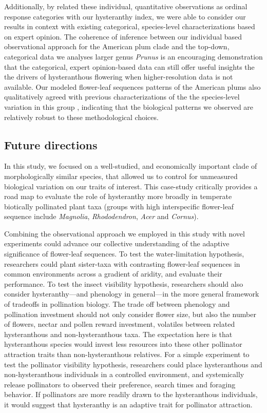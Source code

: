 \documentclass{article}[11pt]
\begin{document}
{Additionally, by related these individual, quantitative observations as ordinal response categories with our hysteranthy index, we were able to consider our results in context with existing categorical, species-level characterizations based on expert opinion. The coherence of inference between our individual based observational approach for the American plum clade and the top-down, categorical data we analyses larger genus \emph{Prunus} is an encouraging demonstration that the categorical, expert opinion-based data can still offer useful insights the the drivers of hysteranthous flowering when higher-resolution data is not available. Our modeled flower-leaf sequences patterns of the American plums also qualitatively agreed with previous characterizations of the the species-level variation in this group \citep{Shaw:2004aa}, indicating that the biological patterns we observed are relatively robust to these methodological choices.

\subsection*{Future directions}

In this study, we focused on a well-studied, and economically important clade of morphologically similar species, that allowed us to control for unmeasured biological variation on our traits of interest. This case-study critically provides a road map to evaluate the role of hysteranthy more broadly in temperate biotically pollinated plant taxa (groups with high interspecific flower-leaf sequence include \emph{Magnolia}, \emph{Rhododendron}, \emph{Acer} and \emph{Cornus}). 

Combining the observational approach we employed in this study with novel experiments could advance our collective understanding of the adaptive significance of flower-leaf sequences. To test the water-limitation hypothesis, researchers could plant sister-taxa with contrasting flower-leaf sequences in common environments across a gradient of aridity, and evaluate their performance. To test the insect visibility hypothesis, researchers should also consider hysteranthy---and phenology in general---in the more general framework of tradeoffs in pollination biology. The trade off between phenology and pollination investment should not only consider flower size, but also the number of flowers, nectar and pollen reward investment, volatiles between related hysteranthous and non-hysteranthous taxa. The expectation here is that hysteranthous species would invest less resources into these other pollinator attraction traits than non-hysteranthous relatives. For a simple experiment to test the pollinator visibility hypothesis, researchers could place hysteranthous and non-hysteranthous individuals in a controlled environment, and systemically release pollinators to observed their preference, search times and foraging behavior. If pollinators are more readily drawn to the hysteranthous individuals, it would suggest that hysteranthy is an adaptive trait for pollinator attraction.

}
\end{document}

